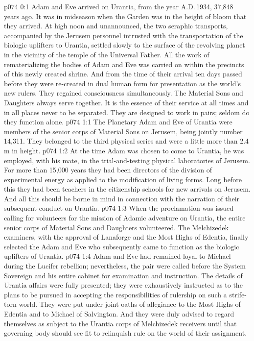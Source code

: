 \author{Solonia}
\vs p074 0:1 Adam and Eve arrived on Urantia, from the year A.D.\,1934, 37,848 years ago. It was in midseason when the Garden was in the height of bloom that they arrived. At high noon and unannounced, the two seraphic transports, accompanied by the Jerusem personnel intrusted with the transportation of the biologic uplifters to Urantia, settled slowly to the surface of the revolving planet in the vicinity of the temple of the Universal Father. All the work of rematerializing the bodies of Adam and Eve was carried on within the precincts of this newly created shrine. And from the time of their arrival ten days passed before they were re\hyp{}created in dual human form for presentation as the world’s new rulers. They regained consciousness simultaneously. The Material Sons and Daughters always serve together. It is the essence of their service at all times and in all places never to be separated. They are designed to work in pairs; seldom do they function alone.
\vs p074 1:1 The Planetary Adam and Eve of Urantia were members of the senior corps of Material Sons on Jerusem, being jointly number 14,311. They belonged to the third physical series and were a little more than 2.4\,m in height.
\vs p074 1:2 At the time Adam was chosen to come to Urantia, he was employed, with his mate, in the trial\hyp{}and\hyp{}testing physical laboratories of Jerusem. For more than 15,000 years they had been directors of the division of experimental energy as applied to the modification of living forms. Long before this they had been teachers in the citizenship schools for new arrivals on Jerusem. And all this should be borne in mind in connection with the narration of their subsequent conduct on Urantia.
\vs p074 1:3 When the proclamation was issued calling for volunteers for the mission of Adamic adventure on Urantia, the entire senior corps of Material Sons and Daughters volunteered. The Melchizedek examiners, with the approval of Lanaforge and the Most Highs of Edentia, finally selected the Adam and Eve who subsequently came to function as the biologic uplifters of Urantia.
\vs p074 1:4 Adam and Eve had remained loyal to Michael during the Lucifer rebellion; nevertheless, the pair were called before the System Sovereign and his entire cabinet for examination and instruction. The details of Urantia affairs were fully presented; they were exhaustively instructed as to the plans to be pursued in accepting the responsibilities of rulership on such a strife\hyp{}torn world. They were put under joint oaths of allegiance to the Most Highs of Edentia and to Michael of Salvington. And they were duly advised to regard themselves as subject to the Urantia corps of Melchizedek receivers until that governing body should see fit to relinquish rule on the world of their assignment.
